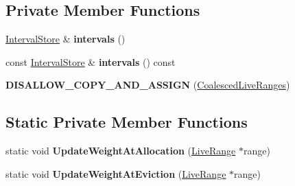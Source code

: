 \subsection*{Private Member Functions}
\begin{DoxyCompactItemize}
\item 
\hyperlink{classv8_1_1internal_1_1_zone_set}{Interval\+Store} \& {\bfseries intervals} ()\hypertarget{classv8_1_1internal_1_1compiler_1_1_coalesced_live_ranges_a1d449f7d0ff34ceb20a44630bd5889b5}{}\label{classv8_1_1internal_1_1compiler_1_1_coalesced_live_ranges_a1d449f7d0ff34ceb20a44630bd5889b5}

\item 
const \hyperlink{classv8_1_1internal_1_1_zone_set}{Interval\+Store} \& {\bfseries intervals} () const \hypertarget{classv8_1_1internal_1_1compiler_1_1_coalesced_live_ranges_a5f214e5325c7c7560e66c8e4d2b72801}{}\label{classv8_1_1internal_1_1compiler_1_1_coalesced_live_ranges_a5f214e5325c7c7560e66c8e4d2b72801}

\item 
{\bfseries D\+I\+S\+A\+L\+L\+O\+W\+\_\+\+C\+O\+P\+Y\+\_\+\+A\+N\+D\+\_\+\+A\+S\+S\+I\+GN} (\hyperlink{classv8_1_1internal_1_1compiler_1_1_coalesced_live_ranges}{Coalesced\+Live\+Ranges})\hypertarget{classv8_1_1internal_1_1compiler_1_1_coalesced_live_ranges_ad4266b46e8e0ae281600f9a4a266c07a}{}\label{classv8_1_1internal_1_1compiler_1_1_coalesced_live_ranges_ad4266b46e8e0ae281600f9a4a266c07a}

\end{DoxyCompactItemize}
\subsection*{Static Private Member Functions}
\begin{DoxyCompactItemize}
\item 
static void {\bfseries Update\+Weight\+At\+Allocation} (\hyperlink{classv8_1_1internal_1_1compiler_1_1_live_range}{Live\+Range} $\ast$range)\hypertarget{classv8_1_1internal_1_1compiler_1_1_coalesced_live_ranges_aa85d1b49844c4a557ad239fbe7bad557}{}\label{classv8_1_1internal_1_1compiler_1_1_coalesced_live_ranges_aa85d1b49844c4a557ad239fbe7bad557}

\item 
static void {\bfseries Update\+Weight\+At\+Eviction} (\hyperlink{classv8_1_1internal_1_1compiler_1_1_live_range}{Live\+Range} $\ast$range)\hypertarget{classv8_1_1internal_1_1compiler_1_1_coalesced_live_ranges_a90c6bd251fafce6606803a2940bcf73e}{}\label{classv8_1_1internal_1_1compiler_1_1_coalesced_live_ranges_a90c6bd251fafce6606803a2940bcf73e}

\end{DoxyCompactItemize}
